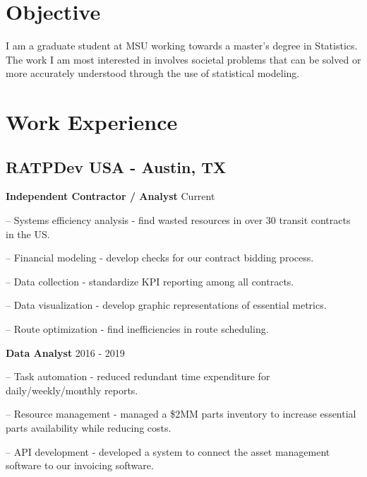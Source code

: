 \documentclass[12pt]{cavender_cv}
\begin{document}
\vspace{16pt}
\vspace{25pt}

\hspace{-.75cm}\begin{minipage}[t]{0.65\textwidth}
\section{Objective}
I am a graduate student at MSU working 
towards a master's degree in Statistics.
The work I am most interested in involves
societal problems that can be solved or
more accurately understood through the use 
of statistical modeling. 
\subsecspace 

\section{Work Experience}
\subsection{RATPDev USA - Austin, TX}
\textbf{Independent Contractor / Analyst} \hfill Current 
\begin{hangparas}{.25in}{1}

-- Systems efficiency analysis - find wasted resources
in over 30 transit contracts in the US.

-- Financial modeling - develop checks for our contract
bidding process.

-- Data collection - standardize KPI reporting 
among all contracts. 

-- Data visualization - develop graphic representations
of essential metrics. 

-- Route optimization - find inefficiencies in route
scheduling.
\end{hangparas}
\vspace{4pt}

\textbf{Data Analyst} \hfill 2016 - 2019 
\begin{hangparas}{.25in}{1}

-- Task automation - reduced redundant time expenditure
for daily/weekly/monthly reports.

-- Resource management - managed a \$2MM  parts inventory
to increase essential parts availability while reducing 
costs.

-- API development - developed a system to connect the 
asset management software to our invoicing software.
\end{hangparas}


\end{minipage}
\end{document}
